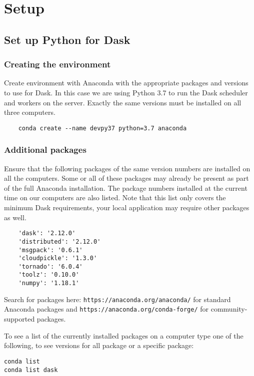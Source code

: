 
\chapter{\libradtrandask{} Setup}
\label{chap:libradtrandaskSetup}

\section{Set up Python for Dask}

\subsection{Creating the environment}

Create environment with Anaconda with the appropriate packages and versions to use for Dask.
In this case we are using Python 3.7 to run the Dask scheduler and workers on the server.
Exactly the same versions must be installed on all three computers.

\begin{lstlisting}
    conda create --name devpy37 python=3.7 anaconda
\end{lstlisting}

\subsection{Additional packages}
\label{sec:Additionalpackages}

Ensure that the following packages of the same version numbers are installed on all the computers. 
Some or all of these packages may already be present as part of the full Anaconda installation.
The package numbers installed at the current time on our computers are also listed.
Note that this list only covers the minimum Dask requirements, your local application may require other packages as well.
\begin{lstlisting}
    'dask': '2.12.0'
    'distributed': '2.12.0'
    'msgpack': '0.6.1'
    'cloudpickle': '1.3.0'
    'tornado': '6.0.4'
    'toolz': '0.10.0'
    'numpy': '1.18.1'
\end{lstlisting}

Search for packages here: 
\lstinline{https://anaconda.org/anaconda/} for standard Anaconda packages and 
\lstinline{https://anaconda.org/conda-forge/} for community-supported packages.

To see a list of the currently installed packages on a computer type one of the following, to see versions for all package or a specific package:
\begin{lstlisting}
conda list
conda list dask
\end{lstlisting}

